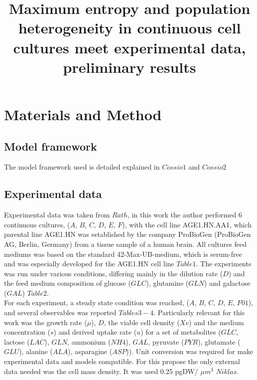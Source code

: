 \documentclass[]{article}
\title{Maximum entropy and population heterogeneity in continuous cell cultures meet experimental data, preliminary results}
\author{}
\begin{document}
\maketitle







\section{Materials and Method} %
\subsection{Model framework }
	
	The model framework used is detailed explained in $Cossio1$ and $Cossio2$
	
\subsection{Experimental data} %
	  
	Experimental data was taken from $Rath$, in this work the author performed 6 continuous cultures, ($A$, $B$, $C$, $D$, $E$, $F$), with the cell line AGE1.HN.AA1, which parental line AGE1.HN was established by the company ProBioGen (ProBioGen AG, Berlin, Germany) from a tissue sample of a human brain. All cultures feed mediums was based on the standard 42-Max-UB-medium, which is serum-free and was especially developed for the AGE1.HN cell line $Table 1$. The experiments was run under various conditions, differing mainly in the dilution rate ($D$) and the feed medium composition of glucose ($GLC$), glutamine ($GLN$) and galactose ($GAL$) $Table 2$. \\
	For each experiment, a steady state condition was reached, ($A$, $B$, $C$, $D$, $E$, $F01$), and several observables  was reported $Tables 3-4$. Particularly relevant for this work was the growth rate ($\mu$), $D$, the viable cell density ($Xv$) and the medium concentration ($s$) and derived uptake rate ($u$) for a set of metabolites ($GLC$, lactose ($LAC$), $GLN$, ammonium ($NH4$), $GAL$, pyruvate ($PYR$), glutamate ($GLU$), alanine ($ALA$), asparagine ($ASP$)). Unit conversion was required for make experimental data and models compatible. For this propose the only external data needed was the cell mass density. It was used  0.25 pgDW/ $\mu$$m^3$ $Niklas$.
	 
\end{document}
